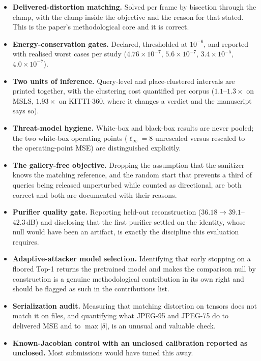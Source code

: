 \documentclass[11pt,a4paper]{article}
\begin{document}
\begin{itemize}
\item \textbf{Delivered-distortion matching.} Solved per frame by bisection
  through the clamp, with the clamp inside the objective and the reason for
  that stated. This is the paper's methodological core and it is correct.
\item \textbf{Energy-conservation gates.} Declared, thresholded at $10^{-6}$,
  and reported with realised worst cases per study
  ($4.76\times10^{-7}$, $5.6\times10^{-7}$, $3.4\times10^{-5}$,
  $4.0\times10^{-7}$).
\item \textbf{Two units of inference.} Query-level and place-clustered
  intervals are printed together, with the clustering cost quantified per
  corpus ($1.1$--$1.3\times$ on MSLS, $1.93\times$ on KITTI-360, where it
  changes a verdict and the manuscript says so).
\item \textbf{Threat-model hygiene.} White-box and black-box results are never
  pooled; the two white-box operating points ($\ell_\infty=8$ unrescaled versus
  rescaled to the operating-point MSE) are distinguished explicitly.
\item \textbf{The gallery-free objective.} Dropping the assumption that the
  sanitizer knows the matching reference, and the random start that prevents a
  third of queries being released unperturbed while counted as directional,
  are both correct and both are documented with their reasons.
\item \textbf{Purifier quality gate.} Reporting held-out reconstruction
  ($36.18 \to 39.1$--$42.3$\,dB) and disclosing that the first purifier settled
  on the identity, whose null would have been an artifact, is exactly the
  discipline this evaluation requires.
\item \textbf{Adaptive-attacker model selection.} Identifying that early
  stopping on a floored Top-1 returns the pretrained model and makes the
  comparison null by construction is a genuine methodological contribution in
  its own right and should be flagged as such in the contributions list.
\item \textbf{Serialization audit.} Measuring that matching distortion on
  tensors does not match it on files, and quantifying what JPEG-95 and JPEG-75
  do to delivered MSE and to $\max\lvert\delta\rvert$, is an unusual and
  valuable check.
\item \textbf{Known-Jacobian control with an unclosed calibration reported as
  unclosed.} Most submissions would have tuned this away.
\end{itemize}
\end{document}
